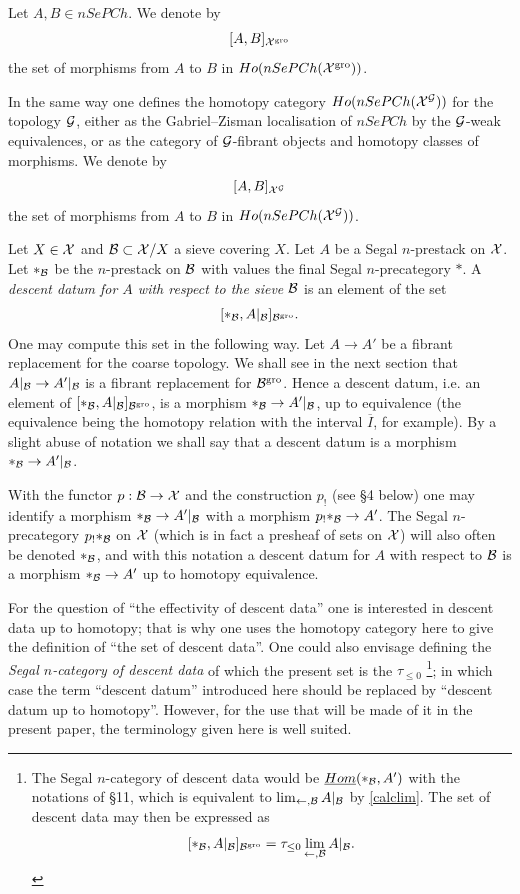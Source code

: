 Let $A, B\in nSePCh$. We denote by
$$
[A,B]_{{\cal X} ^{\rm gro}}
$$
the set of morphisms from $A$ to $B$ in $Ho(nSePCh({\cal X} ^{\rm gro}))$.

In the same way one defines the homotopy category
 $Ho(nSePCh({\cal X} ^{{\cal G}}))$ for the
topology ${\cal G}$,  either as the Gabriel--Zisman localisation of $nSePCh$ by
the ${\cal G}$-weak equivalences, or as the category of ${\cal G}$-fibrant objects
and homotopy classes of morphisms. We denote by
$$
[A,B]_{{\cal X} ^{{\cal G}}}
$$
the set of morphisms from $A$ to $B$ in $Ho(nSePCh({\cal X} ^{{\cal G}}))$.

Let $X\in {\cal X}$ and ${\cal B} \subset {\cal X} /X$ a sieve covering $X$.
Let $A$ be a Segal $n$-prestack on ${\cal X}$. Let $\ast _{{\cal B}}$ be the
$n$-prestack on ${\cal B}$ with values the final Segal $n$-precategory
$\ast$. A {\em
descent datum for $A$ with respect to the sieve ${\cal B}$} is an element of
the set
$$
[\ast _{{\cal B}},A|_{{\cal B}}]_{{\cal B} ^{\rm gro}}.
$$
One may compute this set in the following way. Let $A\rightarrow A'$
be a fibrant replacement for the coarse topology. We shall see in the
next section that $A|_{{\cal B}}\rightarrow A'|_{{\cal B}}$ is a fibrant replacement
for ${\cal B} ^{\rm gro}$. Hence a descent datum, i.e.
an element of
$[\ast _{{\cal B}},A|_{{\cal B}}]_{{\cal B} ^{\rm gro}}$, is a morphism $\ast
_{{\cal B}}\rightarrow A'|_{{\cal B}}$, up to equivalence (the equivalence being
the homotopy relation with the interval $\overline{I}$, for example).
By a slight abuse of notation we shall say that a descent datum is a
morphism $\ast _{{\cal B}}\rightarrow A'|_{{\cal B}}$.

With the functor $p: {\cal B} \rightarrow {\cal X}$ and the construction $p_!$ (see \S 4
below) one may identify a morphism
$\ast _{{\cal B}}\rightarrow A'|_{{\cal B}}$ with a morphism
$p_!\ast _{{\cal B}}\rightarrow A'$. The Segal $n$-precategory $p_!\ast
_{{\cal B}}$
on ${\cal X}$ (which is in fact a presheaf of sets on ${\cal X}$) will
also often
be denoted
$\ast _{{\cal B}}$, and with this notation a descent datum for $A$ with
respect to ${\cal B}$ is a morphism $\ast _{{\cal B}} \rightarrow A'$ up to
homotopy equivalence.




For the question of ``the effectivity of descent data'' one is
interested
in descent data up to homotopy; that is why one uses
the homotopy category here to give the definition of
``the set of descent data''. One could also
envisage defining the {\em Segal $n$-category of descent
data}
of which the present set is the
$\tau _{\leq 0}$
%
%
\footnote{
The Segal $n$-category of descent
data would be $\underline{Hom}(\ast _{{\cal B}}, A')$ with the
notations of \S 11, which is equivalent
to  $\lim _{\leftarrow , {\cal B}}
A|_{{\cal B}}$ by \ref{calclim}.
The set of descent data
may then be expressed as
$$
[\ast _{{\cal B}},A|_{{\cal B}}]_{{\cal B} ^{\rm gro}}=\tau _{\leq 0} \lim _{\leftarrow , {\cal B}}
A|_{{\cal B}}.
$$};
%
%
in which case the term ``descent datum''
introduced here should be replaced by ``descent datum up to
homotopy''. However, for the use that will be made of it
in the present paper, the terminology given here is well suited.

